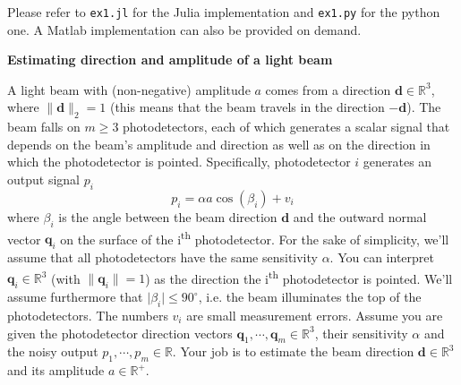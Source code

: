 \documentclass[12pt, answers]{exam}
\begin{document}
\begin{questions}
\begin{parts}
    \begin{solution}
      {\color{blue}
        Please refer to \verb+ex1.jl+ for the Julia implementation and \verb+ex1.py+ for the python one.
        A Matlab implementation can also be provided on demand.
      }
    \end{solution}
  \end{parts}





  \question \textbf{Estimating direction and amplitude of a light beam}

  A light beam with (non-negative) amplitude $a$ comes from a direction $\bm{d} \in \mathbb{R}^3$, where $\| \bm{d} \|_2 = 1$ (this means that the beam travels in the direction $-\bm{d}$).
  The beam falls on $m \geq 3$ photodetectors, each of which generates a scalar signal that depends on the beam's amplitude and direction as well as on the direction in which the photodetector is pointed.
  Specifically, photodetector $i$ generates an output signal $p_i$
  \[
  p_i = \alpha a \cos(\beta_i) + v_i
  \]
  where $\beta_i$ is the angle between the beam direction $\bm{d}$ and the outward normal vector $\bm{q}_i$ on the surface of the i\textsuperscript{th} photodetector.
  For the sake of simplicity, we'll assume that all photodetectors have the same sensitivity $\alpha$.
  You can interpret $\bm{q}_i \in \mathbb{R}^3$ (with $\| \bm{q}_i \| = 1$) as the direction the i\textsuperscript{th} photodetector is pointed.
  We'll assume furthermore that $\vert \beta_i \vert \leq 90^\circ$, i.e. the beam illuminates the top of the photodetectors.
  The numbers $v_i$ are small measurement errors.
  Assume you are given the photodetector direction vectors $\bm{q}_1, \cdots, \bm{q}_m \in \mathbb{R}^3$, their sensitivity $\alpha$ and the noisy output $p_1, \cdots, p_m \in \mathbb{R}$.
  Your job is to estimate the beam direction $\bm{d} \in \mathbb{R}^3$ and its amplitude $a \in \mathbb{R}^+$.

\end{questions}
\end{document}
